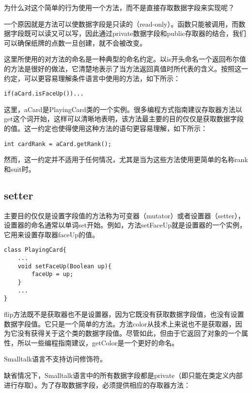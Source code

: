 为什么对这个简单的行为使用一个方法，而不是直接存取数据字段来实现呢？

一个原因就是方法可以使数据字段是只读的（read-only）。函数只能被调用，而数据字段既可以读又可以写，因此通过private数据字段和public存取器的结合，我们可以确保纸牌的点数一旦创建，就不会被改变。


这里所使用的对方法的命名是一种典型的命名约定。以is开头命名一个返回布尔值的方法是很好的做法，它清楚地表示了当方法返回真值时所代表的含义。按照这一约定，可以更容易理解条件语言中使用的方法，如下所示：

\begin{lstlisting}[language={[Sharp]C}]
if(aCard.isFaceUp())...
\end{lstlisting}


这里，aCard是PlayingCard类的一个实例。很多编程方式指南建议存取器方法以get这个词开始，这样可以清晰地表明，该方法最主要的目的仅仅是获取数据字段的值。这一约定也使得使用这种方法的语句更容易理解，如下所示：



\begin{lstlisting}[language={[Sharp]C}]
int cardRank = aCard.getRank();
\end{lstlisting}

然而，这一约定并不适用于任何情况，尤其是当为这些方法使用更简单的名称rank和suit时。

\subsection{setter}


主要目的仅仅是设置字段值的方法称为可变器（mutator）或者设置器（setter），设置器的命名通常以单词set开始。例如，方法setFaceUp就是设置器的一个实例，它用来设置存取器faceUp的值。


\begin{lstlisting}[language={[Sharp]C}]
class PlayingCard{
	...
	void setFaceUp(Boolean up){
		faceUp = up;
	}
	...
}
\end{lstlisting}

flip方法既不是获取器也不是设置器，因为它既没有获取数据字段值，也没有设置数据字段值。它只是一个简单的方法。方法color从技术上来说也不是获取器，因为它没有获得关于这个类的数据字段值。尽管如此，但由于它返回了对象的一个属性，所以一些编程指南建议，getColor是一个更好的命名。


Smalltalk语言不支持访问修饰符。

缺省情况下，Smalltalk语言中的所有数据字段都是private（即只能在类定义内部进行存取）。为了存取数据字段，必须提供相应的存取器方法：



